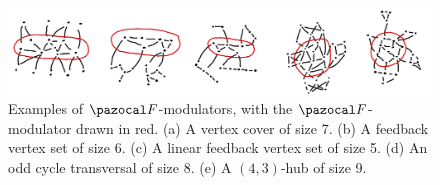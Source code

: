 \begin{figure}
    \includegraphics[width=\textwidth]{figures/fkv-graph-example.png}
    \caption{Examples of $\F$-modulators, with the $\F$-modulator drawn in red. (a) A vertex cover of size 7. (b) A feedback vertex set of size 6. (c) A linear feedback vertex set of size 5. (d) An odd cycle transversal of size 8. (e) A $(4, 3)$-hub of size 9.}
    \label{fig:fkv-graph-example}
\end{figure}
